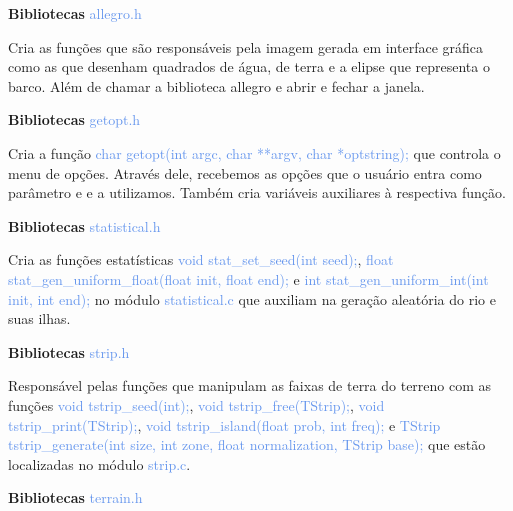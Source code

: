 \documentclass[a4paper,12pt]{article}
\begin{document}
\newpage %

{\Large \textcolor{NavyBlue}{ \textbf{Bibliotecas  }}}{\large \textcolor{CornflowerBlue}{  allegro.h}}
\bigskip

Cria as funções que são responsáveis pela imagem gerada em interface gráfica como as que
desenham quadrados de água, de terra e a elipse que representa o barco. Além de chamar a
biblioteca allegro e abrir e fechar a janela. 
\bigskip
\bigskip
\bigskip

{\Large \textcolor{NavyBlue}{ \textbf{Bibliotecas  }}}{\large \textcolor{CornflowerBlue}{  getopt.h}}
\bigskip

Cria a função {\textcolor{CornflowerBlue}{char getopt(int argc, char **argv, char *optstring);}}
que controla o menu de opções. Através dele, recebemos as opções que o usuário entra como parâmetro e 
e a utilizamos. Também cria variáveis auxiliares à respectiva função.
\bigskip
\bigskip
\bigskip

{\Large \textcolor{NavyBlue}{ \textbf{Bibliotecas  }}}{\large \textcolor{CornflowerBlue}{  statistical.h}}
\bigskip

Cria as funções estatísticas
{\textcolor{CornflowerBlue}{void  stat\_set\_seed(int seed);}},  
{\textcolor{CornflowerBlue}{float stat\_gen\_uniform\_float(float init, float end);}} e 
{\textcolor{CornflowerBlue}{int stat\_gen\_uniform\_int(int init, int end);}} no módulo 
{\textcolor{CornflowerBlue}{statistical.c}} que auxiliam na geração aleatória do rio e suas ilhas.
\bigskip
\bigskip
\bigskip

{\Large \textcolor{NavyBlue}{ \textbf{Bibliotecas  }}}{\large \textcolor{CornflowerBlue}{  strip.h}}
\bigskip

Responsável pelas funções que manipulam as faixas de terra do terreno com as funções
{\textcolor{CornflowerBlue}{void   tstrip\_seed(int);}}, 
{\textcolor{CornflowerBlue}{void   tstrip\_free(TStrip);}}, 
{\textcolor{CornflowerBlue}{void   tstrip\_print(TStrip);}}, 
{\textcolor{CornflowerBlue}{void   tstrip\_island(float prob, int freq);}} e 
{\textcolor{CornflowerBlue}{TStrip tstrip\_generate(int size, int zone, float normalization, TStrip base);}} que estão localizadas no módulo 
{\textcolor{CornflowerBlue}{strip.c}}.
\bigskip
\bigskip
\bigskip

{\Large \textcolor{NavyBlue}{ \textbf{Bibliotecas  }}}{\large \textcolor{CornflowerBlue}{  terrain.h}}
\bigskip
\end{document}
